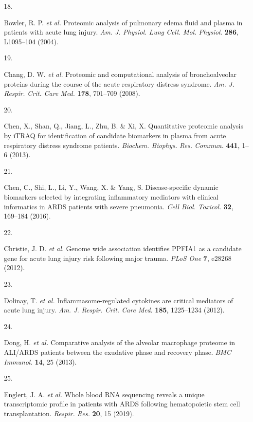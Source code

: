 \documentclass[
  11,
  a4paper,
]{article}
\newlength{\cslhangindent}
\newlength{\csllabelwidth}
\newenvironment{CSLReferences}[2] %
 {\begin{list}{}{%
  \setlength{\itemindent}{0pt}
  \setlength{\leftmargin}{0pt}
  \setlength{\parsep}{0pt}
  \ifodd #1
   \setlength{\leftmargin}{\cslhangindent}
   \setlength{\itemindent}{-1\cslhangindent}
  \fi
  \setlength{\itemsep}{#2\baselineskip}}}
 {\end{list}}
\newcommand{\CSLLeftMargin}[1]{\parbox[t]{\csllabelwidth}{\strut#1\strut}}
\newcommand{\CSLRightInline}[1]{\parbox[t]{\linewidth - \csllabelwidth}{\strut#1\strut}}
\begin{document}
\begin{CSLReferences}{0}{0}
\CSLLeftMargin{18. }%
\CSLRightInline{Bowler, R. P. \emph{et al.} Proteomic analysis of
pulmonary edema fluid and plasma in patients with acute lung injury.
\emph{Am. J. Physiol. Lung Cell. Mol. Physiol.} \textbf{286}, L1095--104
(2004).}

\CSLLeftMargin{19. }%
\CSLRightInline{Chang, D. W. \emph{et al.} Proteomic and computational
analysis of bronchoalveolar proteins during the course of the acute
respiratory distress syndrome. \emph{Am. J. Respir. Crit. Care Med.}
\textbf{178}, 701--709 (2008).}

\CSLLeftMargin{20. }%
\CSLRightInline{Chen, X., Shan, Q., Jiang, L., Zhu, B. \& Xi, X.
Quantitative proteomic analysis by {iTRAQ} for identification of
candidate biomarkers in plasma from acute respiratory distress syndrome
patients. \emph{Biochem. Biophys. Res. Commun.} \textbf{441}, 1--6
(2013).}

\CSLLeftMargin{21. }%
\CSLRightInline{Chen, C., Shi, L., Li, Y., Wang, X. \& Yang, S.
Disease-specific dynamic biomarkers selected by integrating inflammatory
mediators with clinical informatics in {ARDS} patients with severe
pneumonia. \emph{Cell Biol. Toxicol.} \textbf{32}, 169--184 (2016).}

\CSLLeftMargin{22. }%
\CSLRightInline{Christie, J. D. \emph{et al.} Genome wide association
identifies {PPFIA1} as a candidate gene for acute lung injury risk
following major trauma. \emph{PLoS One} \textbf{7}, e28268 (2012).}

\CSLLeftMargin{23. }%
\CSLRightInline{Dolinay, T. \emph{et al.} Inflammasome-regulated
cytokines are critical mediators of acute lung injury. \emph{Am. J.
Respir. Crit. Care Med.} \textbf{185}, 1225--1234 (2012).}

\CSLLeftMargin{24. }%
\CSLRightInline{Dong, H. \emph{et al.} Comparative analysis of the
alveolar macrophage proteome in {ALI/ARDS} patients between the
exudative phase and recovery phase. \emph{BMC Immunol.} \textbf{14}, 25
(2013).}

\CSLLeftMargin{25. }%
\CSLRightInline{Englert, J. A. \emph{et al.} Whole blood {RNA}
sequencing reveals a unique transcriptomic profile in patients with
{ARDS} following hematopoietic stem cell transplantation. \emph{Respir.
Res.} \textbf{20}, 15 (2019).}


\end{CSLReferences}
\end{document}
